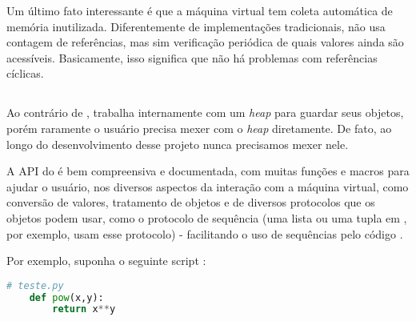 
      Um último fato interessante é que a máquina virtual tem coleta automática
      de memória inutilizada. Diferentemente de implementações tradicionais,
       não usa contagem de referências, mas sim verificação periódica
      de quais valores ainda são acessíveis. Basicamente, isso significa que não
      há problemas com referências cíclicas.

    \subsection{}
    Ao contrário de ,  trabalha internamente com um
    \emph{heap} para guardar seus objetos, porém raramente o usuário precisa
    mexer com o \textit{heap} diretamente. De fato, ao longo do desenvolvimento 
    desse projeto nunca precisamos mexer nele.

    A API \C{} do  é bem compreensiva e documentada, com muitas funções e
    macros para ajudar o usuário, nos diversos aspectos da interação com a
    máquina virtual, como conversão de valores, tratamento de objetos e de
    diversos protocolos que os objetos podem usar, como o protocolo de sequência
    (uma lista ou uma tupla em , por exemplo, usam esse protocolo) -
    facilitando o uso de sequências pelo código \C{}.
    
    Por exemplo, suponha o seguinte script :
    \begin{lstlisting}[language=python]
    # teste.py
    def pow(x,y):
        return x**y
    \end{lstlisting}
    
